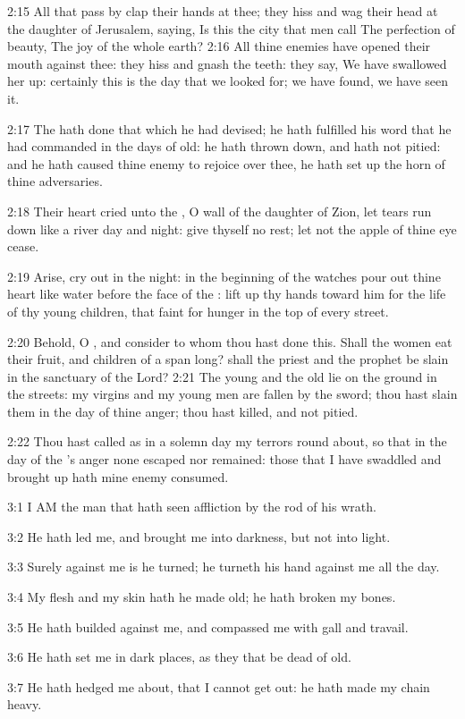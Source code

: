 2:15 All that pass by clap their hands at thee; they hiss and wag their head at the daughter of Jerusalem, saying, Is this the city that men call The perfection of beauty, The joy of the whole earth?  2:16 All thine enemies have opened their mouth against thee: they hiss and gnash the teeth: they say, We have swallowed her up: certainly this is the day that we looked for; we have found, we have seen it.

2:17 The \LORD hath done that which he had devised; he hath fulfilled his word that he had commanded in the days of old: he hath thrown down, and hath not pitied: and he hath caused thine enemy to rejoice over thee, he hath set up the horn of thine adversaries.

2:18 Their heart cried unto the \LORD, O wall of the daughter of Zion, let tears run down like a river day and night: give thyself no rest; let not the apple of thine eye cease.

2:19 Arise, cry out in the night: in the beginning of the watches pour out thine heart like water before the face of the \LORD: lift up thy hands toward him for the life of thy young children, that faint for hunger in the top of every street.

2:20 Behold, O \LORD, and consider to whom thou hast done this. Shall the women eat their fruit, and children of a span long? shall the priest and the prophet be slain in the sanctuary of the Lord?  2:21 The young and the old lie on the ground in the streets: my virgins and my young men are fallen by the sword; thou hast slain them in the day of thine anger; thou hast killed, and not pitied.

2:22 Thou hast called as in a solemn day my terrors round about, so that in the day of the \LORD's anger none escaped nor remained: those that I have swaddled and brought up hath mine enemy consumed.

3:1 I AM the man that hath seen affliction by the rod of his wrath.

3:2 He hath led me, and brought me into darkness, but not into light.

3:3 Surely against me is he turned; he turneth his hand against me all the day.

3:4 My flesh and my skin hath he made old; he hath broken my bones.

3:5 He hath builded against me, and compassed me with gall and travail.

3:6 He hath set me in dark places, as they that be dead of old.

3:7 He hath hedged me about, that I cannot get out: he hath made my chain heavy.

